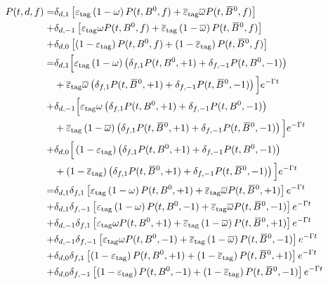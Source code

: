 \begin{align}
P(t,d,f) =& \delta_{d,1}\left[\varepsilon_\text{tag}\left(1-\omega\right)P(t,\Bz,f)
  + \overline{\varepsilon}_\text{tag}\overline{\omega}P(t,\Bzb,f)\right]\nonumber\\
+&\delta_{d,-1}\left[\varepsilon_\text{tag}\omega P(t,\Bz,f) + \overline{\varepsilon}_\text{tag}\left(1-\overline{\omega}\right)P(t,\Bzb,f)\right]\nonumber\\
+&\delta_{d,0}\left[\left(1-\varepsilon_\text{tag}\right) P(t,\Bz,f) + \left(1-\overline{\varepsilon}_\text{tag}\right)P(t,\Bzb,f)\right]\nonumber\\
=& \delta_{d,1}\Big[\varepsilon_\text{tag}\left(1-\omega\right)\left(\delta_{f,1}P(t,\Bz,+1) + \delta_{f,-1}P(t,\Bz,-1)\right)\nonumber\\
&+\overline{\varepsilon}_\text{tag}\overline{\omega}\left(\delta_{f,1}P(t,\Bzb,+1) + \delta_{f,-1}P(t,\Bzb,-1)\right)\Big]e^{-\Gamma t}\nonumber\\
+&\delta_{d,-1}\Big[\varepsilon_\text{tag}\omega\left(\delta_{f,1}P(t,\Bz,+1) + \delta_{f,-1}P(t,\Bz,-1)\right)\nonumber\\
&+\overline{\varepsilon}_\text{tag}\left(1-\overline{\omega}\right)\left(\delta_{f,1}P(t,\Bzb,+1)
  + \delta_{f,-1}P(t,\Bzb,-1)\right)\Big]e^{-\Gamma t}\nonumber\\
+&\delta_{d,0}\Big[\left(1-\varepsilon_\text{tag}\right)\left(\delta_{f,1}P(t,\Bz,+1) + \delta_{f,-1}P(t,\Bz,-1)\right)\nonumber\\
&+\left(1-\overline{\varepsilon}_\text{tag}\right)\left(\delta_{f,1}P(t,\Bzb,+1) + \delta_{f,-1}P(t,\Bzb,-1)\right)\Big]e^{-\Gamma t}\nonumber\\
=&\delta_{d,1}\delta_{f,1}\left[\varepsilon_\text{tag}\left(1-\omega\right)P(t,\Bz,+1)
  + \overline{\varepsilon}_\text{tag}\overline{\omega}P(t,\Bzb,+1)\right]e^{-\Gamma t}\label{eq:oneTagger_one}\\
+&\delta_{d,1}\delta_{f,-1}\left[\varepsilon_\text{tag}\left(1-\omega\right)P(t,\Bz,-1)
  + \overline{\varepsilon}_\text{tag}\overline{\omega}P(t,\Bzb,-1)\right]e^{-\Gamma t}\label{eq:oneTagger_two}\\
+&\delta_{d,-1}\delta_{f,1}\left[\varepsilon_\text{tag}\omega P(t,\Bz,+1)
  + \overline{\varepsilon}_\text{tag}\left(1-\overline{\omega}\right)P(t,\Bzb,+1)\right]e^{-\Gamma t}\label{eq:oneTagger_three}\\
+&\delta_{d,-1}\delta_{f,-1}\left[\varepsilon_\text{tag}\omega P(t,\Bz,-1)
  + \overline{\varepsilon}_\text{tag}\left(1-\overline{\omega}\right)P(t,\Bzb,-1)\right]e^{-\Gamma t}\label{eq:oneTagger_four}\\
+&\delta_{d,0}\delta_{f,1}\left[\left(1-\varepsilon_\text{tag}\right) P(t,\Bz,+1)
  + \left(1-\overline{\varepsilon}_\text{tag}\right)P(t,\Bzb,+1)\right]e^{-\Gamma t}\label{eq:oneTagger_five}\\
+&\delta_{d,0}\delta_{f,-1}\left[\left(1-\varepsilon_\text{tag}\right) P(t,\Bz,-1)
  + \left(1-\overline{\varepsilon}_\text{tag}\right)P(t,\Bzb,-1)\right]e^{-\Gamma t}\label{eq:oneTagger_six}
\end{align}
